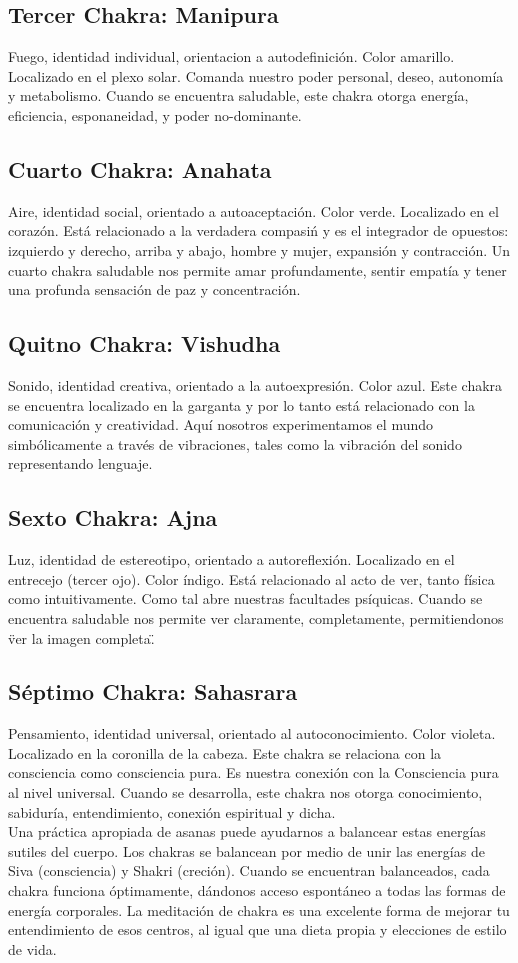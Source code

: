 \subsection{Tercer Chakra: Manipura}
Fuego, identidad individual, orientacion a autodefinición. Color amarillo. Localizado en el plexo solar. Comanda nuestro poder personal, deseo, autonomía y metabolismo. Cuando se encuentra saludable, este chakra otorga energía, eficiencia, esponaneidad, y poder no-dominante.
\subsection{Cuarto Chakra: Anahata}
Aire, identidad social, orientado a autoaceptación. Color verde. Localizado en el corazón. Está relacionado a la verdadera compasiń y es el integrador de opuestos: izquierdo y derecho, arriba y abajo, hombre y mujer, expansión y contracción. Un cuarto chakra saludable nos permite amar profundamente, sentir empatía y tener una profunda sensación de paz y concentración.
\subsection{Quitno Chakra: Vishudha}
Sonido, identidad creativa, orientado a la autoexpresión. Color azul. Este chakra se encuentra localizado en la garganta y por lo tanto está relacionado con la comunicación y creatividad. Aquí nosotros experimentamos el mundo simbólicamente a trav\'es de vibraciones, tales como la vibración del sonido representando lenguaje.
\subsection{Sexto Chakra: Ajna}
Luz, identidad de estereotipo, orientado a autoreflexión. Localizado en el entrecejo (tercer ojo). Color índigo. Está relacionado al acto de ver, tanto física como intuitivamente. Como tal abre nuestras facultades psíquicas. Cuando se encuentra saludable nos permite ver claramente, completamente, permitiendonos \"ver la imagen completa\".
\subsection{S\'eptimo Chakra: Sahasrara}
Pensamiento, identidad universal, orientado al autoconocimiento. Color violeta. Localizado en la coronilla de la cabeza. Este chakra se relaciona con la consciencia como consciencia pura. Es nuestra conexión con la Consciencia pura al nivel universal. Cuando se desarrolla, este chakra nos otorga conocimiento, sabiduría, entendimiento, conexión espiritual y dicha.
\\
Una práctica apropiada de asanas puede ayudarnos a balancear estas energías sutiles del cuerpo. Los chakras se balancean por medio de unir las energías de Siva (consciencia) y Shakri (creción). Cuando se encuentran balanceados, cada chakra funciona óptimamente, dándonos acceso espontáneo a todas las formas de energía corporales. La meditación de chakra es una excelente forma de mejorar tu entendimiento de esos centros, al igual que una dieta propia y elecciones de estilo de vida.

